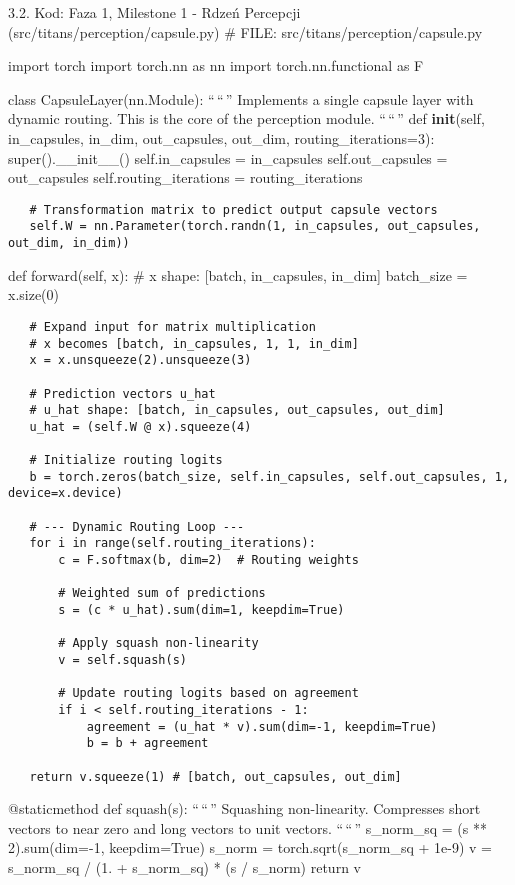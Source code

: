 \documentclass[letterpaper,twocolumn]{article}
\begin{document}
3.2. Kod: Faza 1, Milestone 1 - Rdzeń Percepcji
(src/titans/perception/capsule.py) \# FILE:
src/titans/perception/capsule.py

import torch import torch.nn as nn import torch.nn.functional as F

class CapsuleLayer(nn.Module): ``\,``\,'' Implements a single capsule
layer with dynamic routing. This is the core of the perception module.
``\,``\,'' def \textbf{init}(self, in\_capsules, in\_dim, out\_capsules,
out\_dim, routing\_iterations=3): super().\_\_init\_\_()
self.in\_capsules = in\_capsules self.out\_capsules = out\_capsules
self.routing\_iterations = routing\_iterations

\begin{verbatim}
   # Transformation matrix to predict output capsule vectors
   self.W = nn.Parameter(torch.randn(1, in_capsules, out_capsules, out_dim, in_dim))
\end{verbatim}

def forward(self, x): \# x shape: {[}batch, in\_capsules, in\_dim{]}
batch\_size = x.size(0)

\begin{verbatim}
   # Expand input for matrix multiplication
   # x becomes [batch, in_capsules, 1, 1, in_dim]
   x = x.unsqueeze(2).unsqueeze(3)

   # Prediction vectors u_hat
   # u_hat shape: [batch, in_capsules, out_capsules, out_dim]
   u_hat = (self.W @ x).squeeze(4)

   # Initialize routing logits
   b = torch.zeros(batch_size, self.in_capsules, self.out_capsules, 1, device=x.device)

   # --- Dynamic Routing Loop ---
   for i in range(self.routing_iterations):
       c = F.softmax(b, dim=2)  # Routing weights

       # Weighted sum of predictions
       s = (c * u_hat).sum(dim=1, keepdim=True)

       # Apply squash non-linearity
       v = self.squash(s)

       # Update routing logits based on agreement
       if i < self.routing_iterations - 1:
           agreement = (u_hat * v).sum(dim=-1, keepdim=True)
           b = b + agreement
   
   return v.squeeze(1) # [batch, out_capsules, out_dim]
\end{verbatim}

@staticmethod def squash(s): ``\,``\,'' Squashing non-linearity.
Compresses short vectors to near zero and long vectors to unit vectors.
``\,``\,'' s\_norm\_sq = (s ** 2).sum(dim=-1, keepdim=True) s\_norm =
torch.sqrt(s\_norm\_sq + 1e-9) v = s\_norm\_sq / (1. + s\_norm\_sq) * (s
/ s\_norm) return v
\end{document}
